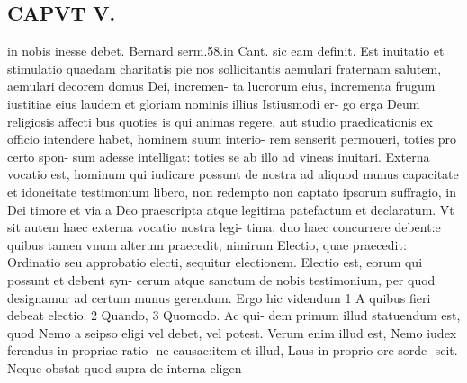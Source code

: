 \documentclass{article}
\begin{document}
\begin{pages}
\section*{CAPVT V. }
\marginpar{[ p.345 ]}\pstart in nobis inesse debet. Bernard serm.58.in Cant. sic eam definit, Est inuitatio et stimulatio quaedam charitatis pie nos sollicitantis aemulari fraternam salutem, aemulari decorem domus Dei, incremen- ta lucrorum eius, incrementa frugum iustitiae eius laudem et gloriam nominis illius Istiusmodi er- go erga Deum religiosis affecti bus quoties is qui animas regere, aut studio praedicationis ex officio intendere habet, hominem suum interio- rem senserit permoueri, toties pro certo spon- sum adesse intelligat: toties se ab illo ad vineas inuitari. Externa vocatio est, hominum qui iudicare possunt de nostra ad aliquod munus capacitate et idoneitate testimonium libero, non redempto non captato ipsorum suffragio, in Dei timore et via a Deo praescripta atque legitima patefactum et declaratum. Vt sit autem haec externa vocatio nostra legi- tima, duo haec concurrere debent:e quibus tamen vnum alterum praecedit, nimirum Electio, quae praecedit: Ordinatio seu approbatio electi, sequitur electionem. Electio est, eorum qui possunt et debent syn- cerum atque sanctum de nobis testimonium, per quod designamur ad certum munus gerendum. Ergo hic videndum 1 A quibus fieri debeat electio. 2 Quando, 3 Quomodo. Ac qui- dem primum illud statuendum est, quod Nemo a seipso eligi vel debet, vel potest. Verum enim illud est, Nemo iudex ferendus in propriae ratio- ne causae:item et illud, Laus in proprio ore sorde- scit. Neque obstat quod supra de interna eligen-  \pend

\end{pages}
\end{document}
